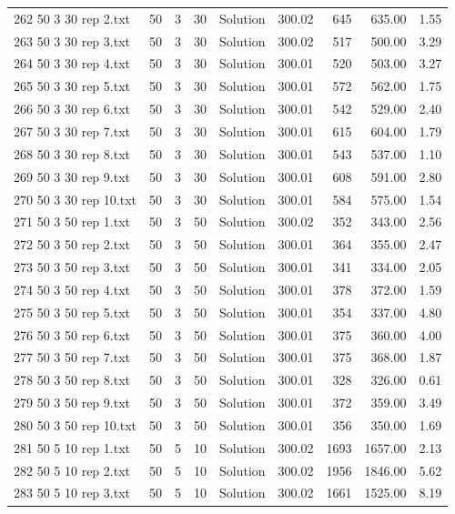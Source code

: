 \begin{longtable}{lrrllrrrr}
262 50 3 30 rep 2.txt & 50 & 3 & 30 & Solution & 300.02 & 645 & 635.00 &  1.55\\
263 50 3 30 rep 3.txt & 50 & 3 & 30 & Solution & 300.02 & 517 & 500.00 &  3.29\\
264 50 3 30 rep 4.txt & 50 & 3 & 30 & Solution & 300.01 & 520 & 503.00 &  3.27\\
265 50 3 30 rep 5.txt & 50 & 3 & 30 & Solution & 300.01 & 572 & 562.00 &  1.75\\
266 50 3 30 rep 6.txt & 50 & 3 & 30 & Solution & 300.01 & 542 & 529.00 &  2.40\\
267 50 3 30 rep 7.txt & 50 & 3 & 30 & Solution & 300.01 & 615 & 604.00 &  1.79\\
268 50 3 30 rep 8.txt & 50 & 3 & 30 & Solution & 300.01 & 543 & 537.00 &  1.10\\
269 50 3 30 rep 9.txt & 50 & 3 & 30 & Solution & 300.01 & 608 & 591.00 &  2.80\\
270 50 3 30 rep 10.txt & 50 & 3 & 30 & Solution & 300.01 & 584 & 575.00 &  1.54\\
271 50 3 50 rep 1.txt & 50 & 3 & 50 & Solution & 300.02 & 352 & 343.00 &  2.56\\
272 50 3 50 rep 2.txt & 50 & 3 & 50 & Solution & 300.01 & 364 & 355.00 &  2.47\\
273 50 3 50 rep 3.txt & 50 & 3 & 50 & Solution & 300.01 & 341 & 334.00 &  2.05\\
274 50 3 50 rep 4.txt & 50 & 3 & 50 & Solution & 300.01 & 378 & 372.00 &  1.59\\
275 50 3 50 rep 5.txt & 50 & 3 & 50 & Solution & 300.01 & 354 & 337.00 &  4.80\\
276 50 3 50 rep 6.txt & 50 & 3 & 50 & Solution & 300.01 & 375 & 360.00 &  4.00\\
277 50 3 50 rep 7.txt & 50 & 3 & 50 & Solution & 300.01 & 375 & 368.00 &  1.87\\
278 50 3 50 rep 8.txt & 50 & 3 & 50 & Solution & 300.01 & 328 & 326.00 &  0.61\\
279 50 3 50 rep 9.txt & 50 & 3 & 50 & Solution & 300.01 & 372 & 359.00 &  3.49\\
280 50 3 50 rep 10.txt & 50 & 3 & 50 & Solution & 300.01 & 356 & 350.00 &  1.69\\
281 50 5 10 rep 1.txt & 50 & 5 & 10 & Solution & 300.02 & 1693 & 1657.00 &  2.13\\
282 50 5 10 rep 2.txt & 50 & 5 & 10 & Solution & 300.02 & 1956 & 1846.00 &  5.62\\
283 50 5 10 rep 3.txt & 50 & 5 & 10 & Solution & 300.02 & 1661 & 1525.00 &  8.19\\

\end{longtable}
